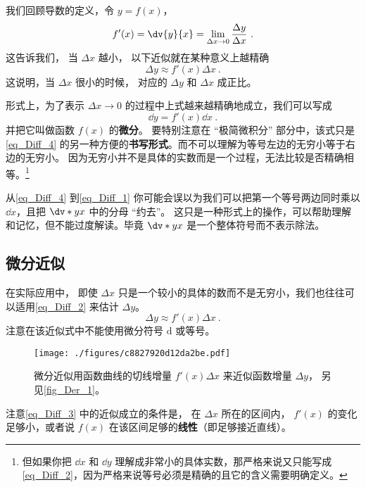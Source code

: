 
我们回顾导数的定义，令 $y = f(x)$，
\begin{equation}\label{eq_Diff_4}
f'(x) = \dv{y}{x} = \lim_{\Delta x\to 0} \frac{\Delta y}{\Delta x}~.
\end{equation}
这告诉我们， 当 $\Delta x$ 越小， 以下近似就在某种意义上越精确
\begin{equation}\label{eq_Diff_2}
\Delta y \approx f'(x) \Delta x~.
\end{equation}
这说明，当 $\Delta x$ 很小的时候， 对应的 $\Delta y$ 和 $\Delta x$ 成正比。

形式上，为了表示 $\Delta x\to 0$ 的过程中上式越来越精确地成立，我们可以写成
\begin{equation}\label{eq_Diff_1}
\dd{y} = f'(x)\dd{x}~.
\end{equation}
并把它叫做函数 $f(x)$ 的\textbf{微分}。 要特别注意在 “极简微积分” 部分中，该式只是\autoref{eq_Diff_4} 的另一种方便的\textbf{书写形式}。而不可以理解为等号左边的无穷小等于右边的无穷小。 因为无穷小并不是具体的实数而是一个过程，无法比较是否精确相等。\footnote{但如果你把 $\dd{x}$ 和 $\dd{y}$ 理解成非常小的具体实数，那严格来说又只能写成\autoref{eq_Diff_2}，因为严格来说等号必须是精确的且它的含义需要明确定义。}

从\autoref{eq_Diff_4} 到\autoref{eq_Diff_1} 你可能会误以为我们可以把第一个等号两边同时乘以 $\dd{x}$，且把 $\dv*{y}{x}$ 中的分母 “约去”。 这只是一种形式上的操作，可以帮助理解和记忆，但不能过度解读。毕竟 $\dv*{y}{x}$ 是一个整体符号而不表示除法。

\subsection{微分近似}\label{sub_Diff_1}

在实际应用中， 即使 $\Delta x$ 只是一个较小的具体的数而不是无穷小，我们也往往可以适用\autoref{eq_Diff_2} 来估计 $\Delta y$。
\begin{equation}\label{eq_Diff_3}
\Delta y \approx f'(x) \Delta x~.
\end{equation}
注意在该近似式中不能使用微分符号 $\mathrm{d}$ 或等号。

\begin{figure}[ht]
\centering
\texttt{[image: ./figures/c8827920d12da2be.pdf]}
\caption{微分近似用函数曲线的切线增量 $f'(x)\Delta x$ 来近似函数增量 $\Delta y$， 另见\autoref{fig_Der_1}。} \label{fig_Diff_1}
\end{figure}
注意\autoref{eq_Diff_3} 中的近似成立的条件是， 在 $\Delta x$ 所在的区间内， $f'(x)$ 的变化足够小，或者说 $f(x)$ 在该区间足够的\textbf{线性}（即足够接近直线）。

